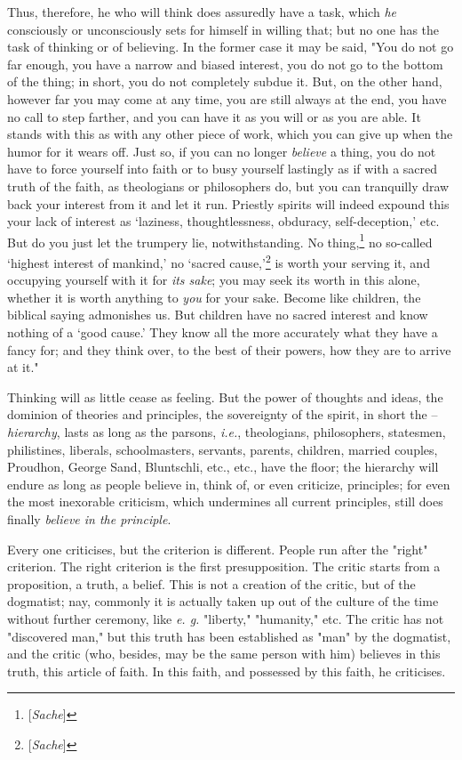 Thus, therefore, he who will think does assuredly have a task, which 
\textit{he} consciously or unconsciously sets for himself in willing that; but 
no one has the task of thinking or of believing. In the former case it may be 
said, "{}You do not go far enough, you have a narrow and biased interest, you 
do not go to the bottom of the thing; in short, you do not completely subdue 
it. But, on the other hand, however far you may come at any time, you are 
still always at the end, you have no call to step farther, and you can have it 
as you will or as you are able. It stands with this as with any other piece of 
work, which you can give up when the humor for it wears off. Just so, if you 
can no longer \textit{believe} a thing, you do not have to force yourself into 
faith or to busy yourself lastingly as if with a sacred truth of the faith, as 
theologians or philosophers do, but you can tranquilly draw back your interest 
from it and let it run. Priestly spirits will indeed expound this your lack of 
interest as `laziness, thoughtlessness, obduracy, self-deception,' etc. 
But do you just let the trumpery lie, notwithstanding. No 
thing,\footnote{[\textit{Sache}]} no so-called `highest interest of 
mankind,' no `sacred cause,'\footnote{[\textit{Sache}]} is worth your 
serving it, and occupying yourself with it for \textit{its sake}; you may seek 
its worth in this alone, whether it is worth anything to \textit{you} for your 
sake. Become like children, the biblical saying admonishes us. But children 
have no sacred interest and know nothing of a `good cause.' They know all 
the more accurately what they have a fancy for; and they think over, to the 
best of their powers, how they are to arrive at it."{}

Thinking will as little cease as feeling. But the power of thoughts and ideas, 
the dominion of theories and principles, the sovereignty of the spirit, in 
short the -- \textit{hierarchy}, lasts as long as the parsons, \textit{i.e.}, 
theologians, philosophers, statesmen, philistines, liberals, schoolmasters, 
servants, parents, children, married couples, Proudhon, George Sand, 
Bluntschli, etc., etc., have the floor; the hierarchy will endure as long as 
people believe in, think of, or even criticize, principles; for even the most 
inexorable criticism, which undermines all current principles, still does 
finally \textit{believe in the principle}.

Every one criticises, but the criterion is different. People run after the 
"{}right"{} criterion. The right criterion is the first presupposition. The 
critic starts from a proposition, a truth, a belief. This is not a creation of 
the critic, but of the dogmatist; nay, commonly it is actually taken up out of 
the culture of the time without further ceremony, like \textit{e. g.} 
"{}liberty,"{} "{}humanity,"{} etc. The critic has not "{}discovered man,"{} 
but this truth has been established as "{}man"{} by the dogmatist, and the 
critic (who, besides, may be the same person with him) believes in this truth, 
this article of faith. In this faith, and possessed by this faith, he 
criticises.


